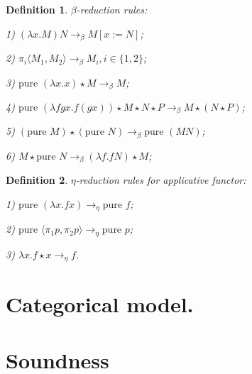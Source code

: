 \documentclass[a4paper]{article}
\newtheorem{defin}{Definition}
\begin{document}
\begin{defin} $\beta$-reduction rules:

1) $(\lambda x. M) N \rightarrow_{\beta} M [x := N]$;

2) $\pi_i \langle M_1, M_2 \rangle \rightarrow_{\beta} M_i, i \in \{ 1,2 \}$;

3) $\text{pure } (\lambda x. x) \star M \rightarrow_{\beta} M$;

4) $\text{pure } (\lambda f g x. f (g x)) \star M \star N \star P \rightarrow_{\beta} M \star (N \star P)$;

5) $(\text{pure } M) \star (\text{pure } N) \rightarrow_{\beta} \text{pure } (M N)$;

6) $M \star \text{pure } N \rightarrow_{\beta} (\lambda f. f N) \star M$;
\end{defin}

\begin{defin} $\eta$-reduction rules for applicative functor:

1) $\text{pure } (\lambda x. f x) \rightarrow_{\eta} \text{pure } f$;

2) $\text{pure } \langle \pi_1 p, \pi_2 p \rangle \rightarrow_{\eta} \text{pure } p$;

3) $\lambda x. f \star x \rightarrow_{\eta} f$.
\end{defin}


\section{Categorical model.}

\section{Soundness}
\end{document}
